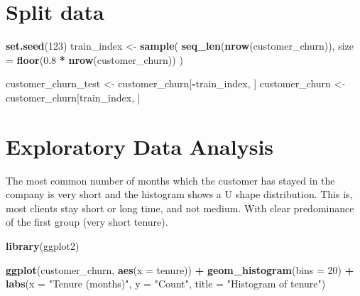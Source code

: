 \documentclass[
  a4paper]{article}
\newenvironment{Shaded}{\begin{snugshade}}{\end{snugshade}}
\newcommand{\AttributeTok}[1]{\textcolor[rgb]{0.13,0.29,0.53}{#1}}
\newcommand{\DecValTok}[1]{\textcolor[rgb]{0.00,0.00,0.81}{#1}}
\newcommand{\FloatTok}[1]{\textcolor[rgb]{0.00,0.00,0.81}{#1}}
\newcommand{\FunctionTok}[1]{\textcolor[rgb]{0.13,0.29,0.53}{\textbf{#1}}}
\newcommand{\NormalTok}[1]{#1}
\newcommand{\OtherTok}[1]{\textcolor[rgb]{0.56,0.35,0.01}{#1}}
\newcommand{\SpecialCharTok}[1]{\textcolor[rgb]{0.81,0.36,0.00}{\textbf{#1}}}
\newcommand{\StringTok}[1]{\textcolor[rgb]{0.31,0.60,0.02}{#1}}
\begin{document}
\hypertarget{split-data}{%
\section{Split data}\label{split-data}}

\begin{Shaded}
\begin{Highlighting}[]
\FunctionTok{set.seed}\NormalTok{(}\DecValTok{123}\NormalTok{)}
\NormalTok{train\_index }\OtherTok{\textless{}{-}} \FunctionTok{sample}\NormalTok{(}
  \FunctionTok{seq\_len}\NormalTok{(}\FunctionTok{nrow}\NormalTok{(customer\_churn)),}
  \AttributeTok{size =} \FunctionTok{floor}\NormalTok{(}\FloatTok{0.8} \SpecialCharTok{*} \FunctionTok{nrow}\NormalTok{(customer\_churn))}
\NormalTok{)}

\NormalTok{customer\_churn\_test }\OtherTok{\textless{}{-}}\NormalTok{ customer\_churn[}\SpecialCharTok{{-}}\NormalTok{train\_index, ]}
\NormalTok{customer\_churn }\OtherTok{\textless{}{-}}\NormalTok{ customer\_churn[train\_index, ]}
\end{Highlighting}
\end{Shaded}

\hypertarget{exploratory-data-analysis}{%
\section{Exploratory Data Analysis}\label{exploratory-data-analysis}}

The most common number of months which the customer has stayed in the
company is very short and the histogram shows a U shape distribution.
This is, most clients stay short or long time, and not medium. With
clear predominance of the first group (very short tenure).

\begin{Shaded}
\begin{Highlighting}[]
\FunctionTok{library}\NormalTok{(ggplot2)}

\FunctionTok{ggplot}\NormalTok{(customer\_churn, }\FunctionTok{aes}\NormalTok{(}\AttributeTok{x =}\NormalTok{ tenure)) }\SpecialCharTok{+}
  \FunctionTok{geom\_histogram}\NormalTok{(}\AttributeTok{bins =} \DecValTok{20}\NormalTok{) }\SpecialCharTok{+}
  \FunctionTok{labs}\NormalTok{(}\AttributeTok{x =} \StringTok{"Tenure (months)"}\NormalTok{, }\AttributeTok{y =} \StringTok{"Count"}\NormalTok{, }\AttributeTok{title =} \StringTok{"Histogram of tenure"}\NormalTok{)}
\end{Highlighting}
\end{Shaded}
\end{document}
